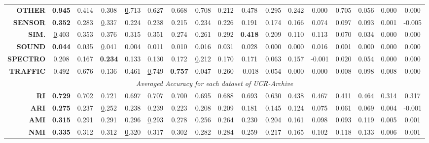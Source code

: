 \begin{table*}[]
{\begin{tabular}{r|c|c|c|c|c|c|c|c|c|c|c|c|c|c|c|c}
\multicolumn{1}{r|}{\textbf{OTHER}}   & \textbf{0.945} & 0.414          & 0.308          & {\ul 0.713}    & 0.627          & 0.668          & 0.708       & 0.212 & 0.478 & 0.295 & 0.242 & 0.000 & 0.705 & 0.056 & 0.000 & 0.000 \\
\multicolumn{1}{r|}{\textbf{SENSOR}}  & \textbf{0.352} & 0.283          & {\ul 0.337}    & 0.224          & 0.238          & 0.215          & 0.234       & 0.226 & 0.191 & 0.174 & 0.166 & 0.074 & 0.097 & 0.093 & 0.001 & -0.005 \\
\multicolumn{1}{r|}{\textbf{SIM.}}    & {\ul 0.403}    & 0.353          & 0.376          & 0.315          & 0.351          & 0.274          & 0.261       & 0.292 & \textbf{0.418} & 0.209 & 0.110 & 0.113 & 0.070 & 0.034 & 0.000 & 0.000 \\
\multicolumn{1}{r|}{\textbf{SOUND}}   & \textbf{0.044} & 0.035          & {\ul 0.041}    & 0.004          & 0.011          & 0.010          & 0.016       & 0.031 & 0.028 & 0.000 & 0.000 & 0.016 & 0.001 & 0.000 & 0.000 & 0.000 \\
\multicolumn{1}{r|}{\textbf{SPECTRO}} & 0.208          & 0.167          & \textbf{0.234} & 0.133          & 0.130          & 0.172          & {\ul 0.212} & 0.170 & 0.171 & 0.063 & 0.157 & -0.001 & 0.020 & 0.054 & 0.000 & 0.000 \\
\multicolumn{1}{r|}{\textbf{TRAFFIC}} & 0.492          & 0.676          & 0.136          & 0.461          & {\ul 0.749}    & \textbf{0.757} & 0.047       & 0.260 & -0.018 & 0.054 & 0.000 & 0.000 & 0.008 & 0.098 & 0.008 & 0.000 \\ \hline
\multicolumn{17}{c}{{\it Averaged Accuracy for each dataset of UCR-Archive}} \\ \hline
\multicolumn{1}{r|}{\textbf{RI}}      & \textbf{0.729} & 0.702          & {\ul 0.721}    & 0.697          & 0.707          & 0.700          & 0.695       & 0.688 & 0.693 & 0.630 & 0.438 & 0.467 & 0.411 & 0.464 & 0.314 & 0.317 \\
\multicolumn{1}{r|}{\textbf{ARI}}     & \textbf{0.275} & 0.237          & {\ul 0.252}    & 0.238          & 0.239          & 0.223          & 0.208       & 0.209 & 0.181 & 0.145 & 0.124 & 0.075 & 0.061 & 0.069 & 0.004 & -0.001 \\
\multicolumn{1}{r|}{\textbf{AMI}}     & \textbf{0.315} & 0.291          & 0.291          & 0.296          & {\ul 0.293}    & 0.278          & 0.256       & 0.264 & 0.230 & 0.204 & 0.161 & 0.098 & 0.093 & 0.119 & 0.005 & 0.001 \\
\multicolumn{1}{r|}{\textbf{NMI}}     & \textbf{0.335} & 0.312          & 0.312          & {\ul 0.320}    & 0.317          & 0.302          & 0.282       & 0.284 & 0.259 & 0.217 & 0.165 & 0.102 & 0.118 & 0.133 & 0.006 & 0.001 \\ \hline

\end{tabular}}
\end{table*}
